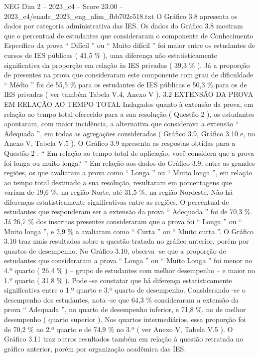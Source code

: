 \begin{textsample}{NEG Dim 2 – 2023\_c4 – Score 23.00 – 2023\_c4/enade\_2023\_eng\_alim\_fbb702e518.txt}
O Gráfico 3.8 apresenta os dados por categoria administrativa das IES.
Os dados do Gráfico 3.8 mostram que o percentual de estudantes que consideraram o componente de Conhecimento Específico da prova “ Difícil ” ou “ Muito difícil ” foi maior entre os estudantes de cursos de IES públicas ( 41,5 \% ), uma diferença não estatisticamente significativa da proporção em relação às IES privadas ( 39,3 \% ).
Já a proporção de presentes na prova que consideraram este componente com grau de dificuldade “ Médio ” foi de 55,5 \% para os estudantes de IES públicas e 50,3 \% para os de IES privadas ( ver também Tabela V.4, Anexo V ). 3.2 EXTENSÃO DA PROVA EM RELAÇÃO AO TEMPO TOTAL Indagados quanto à extensão da prova, em relação ao tempo total oferecido para a sua resolução ( Questão 2 ), os estudantes apontaram, com maior incidência, a alternativa que considerava a extensão “ Adequada ”, em todas as agregações consideradas ( Gráfico 3.9, Gráfico 3.10 e, no Anexo V, Tabela V.5 ).
O Gráfico 3.9 apresenta as respostas obtidas para a Questão 2 : “ Em relação ao tempo total de aplicação, você considera que a prova foi longa ou muito longa? ” Em relação aos dados do Gráfico 3.9, entre as grandes regiões, os que avaliaram a prova como “ Longa ” ou “ Muito longa ”, em relação ao tempo total destinado a sua resolução, resultaram em porcentagens que variam de 19,6 \%, na região Norte, até 31,5 \%, na região Nordeste.
Não há diferenças estatisticamente significativas entre as regiões.
O percentual de estudantes que responderam ser a extensão da prova “ Adequada ” foi de 70,3 \%.
Já 26,7 \% dos inscritos presentes consideraram que a prova foi “ Longa ” ou “ Muito longa ”, e 2,9 \% a avaliaram como “ Curta ” ou “ Muito curta ”.
O Gráfico 3.10 traz mais resultados sobre a questão tratada no gráfico anterior, porém por quartos de desempenho.
No Gráfico 3.10, observa -se que a proporção de estudantes que consideraram a prova “ Longa ” ou “ Muito Longa ” foi menor no 4.º quarto ( 26,4 \% ) – grupo de estudantes com melhor desempenho – e maior no 1.º quarto ( 31,8 \% ).
Pode -se constatar que há diferença estatisticamente significativa entre o 1.º quarto e 3.º quarto de desempenho.
Considerando -se o desempenho dos estudantes, nota -se que 64,3 \% consideraram a extensão da prova “ Adequada ”, no quarto de desempenho inferior, e 71,8 \%, no de melhor desempenho ( quarto superior ).
Nos quartos intermediários, essa proporção foi de 70,2 \% no 2.º quarto e de 74,9 \% no 3.º ( ver Anexo V, Tabela V.5 ).
O Gráfico 3.11 traz outros resultados também em relação à questão retratada no gráfico anterior, porém por organização acadêmica das IES.

\end{textsample}
